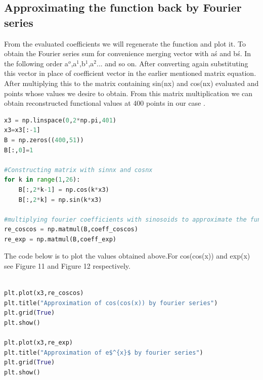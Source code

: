 \documentclass[a4paper]{article}
\begin{document}
\subsection{Approximating the function back by Fourier series}
From the evaluated coefficients we will regenerate the function and plot it.
To obtain the Fourier series sum for convenience merging vector with a\'s and b\'s. In the following order a$^{o}$,a$^{1}$,b$^{1}$,a$^{2}$... and so on.
After converting again substituting this vector in place of coefficient vector in the earlier mentioned matrix equation. After multiplying this to the matrix containing sin(nx) and cos(nx) evaluated and points whose values we desire to obtain. From this matrix multiplication we can obtain reconstructed functional values at 400 points in our case .    
\begin{lstlisting}[language=Python ,caption=To generate and plot $1/(1+t^{2})$]
x3 = np.linspace(0,2*np.pi,401)
x3=x3[:-1]
B = np.zeros((400,51))
B[:,0]=1

#Constructing matrix with sinnx and cosnx 
for k in range(1,26):
	B[:,2*k-1] = np.cos(k*x3)
	B[:,2*k] = np.sin(k*x3)

#multiplying fourier coefficients with sinosoids to approximate the function
re_coscos = np.matmul(B,coeff_coscos)
re_exp = np.matmul(B,coeff_exp)


\end{lstlisting}
The code below is to plot the values obtained above.For cos(cos(x)) and exp(x) see Figure 11 and Figure 12 respectively.
\begin{lstlisting}[language=Python ,caption=To generate and plot $1/(1+t^{2})$]

plt.plot(x3,re_coscos)
plt.title("Approximation of cos(cos(x)) by fourier series")
plt.grid(True)
plt.show()

plt.plot(x3,re_exp)
plt.title("Approximation of e$^{x}$ by fourier series")
plt.grid(True)
plt.show()

\end{lstlisting}
\end{document}
